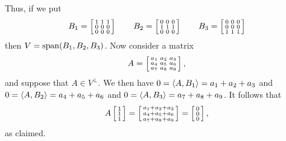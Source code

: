 \begin{itemize}
   Thus, if we put
   {\tiny \[
       B_1 = \bsm 1&1&1\\0&0&0\\0&0&0\esm \hspace{2em}
       B_2 = \bsm 0&0&0\\1&1&1\\0&0&0\esm \hspace{2em}
       B_3 = \bsm 0&0&0\\0&0&0\\1&1&1\esm
   \]}
   then $V=\spn(B_1,B_2,B_3)$.  Now consider a matrix
   \[ A = \bsm a_1&a_2&a_3\\ a_4&a_5&a_6\\ a_7&a_8&a_9\esm, \]
   and suppose that $A\in V^\perp$.  We then have
   $0=\ip{A,B_1}=a_1+a_2+a_3$ and
   $0=\ip{A,B_2}=a_4+a_5+a_6$ and
   $0=\ip{A,B_3}=a_7+a_8+a_9$.
   It follows that
   \[ A\bsm 1\\1\\1\esm =
       \bsm a_1+a_2+a_3\\ a_4+a_5+a_6\\ a_7+a_8+a_9\esm
        = \bsm 0\\ 0\\ 0 \esm,
   \]
   as claimed.
 \end{itemize}
\EndDeferredSolution

